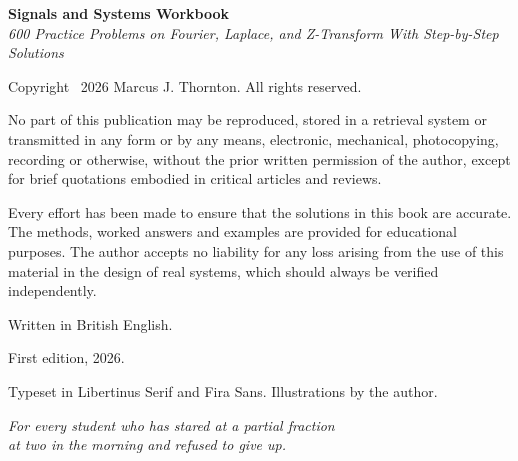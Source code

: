 \clearpage
\thispagestyle{empty}
\vspace*{\fill}
{\footnotesize\setlength{\parindent}{0pt}\setlength{\parskip}{6pt}
\textbf{Signals and Systems Workbook}\\
\textit{600 Practice Problems on Fourier, Laplace, and Z-Transform With Step-by-Step Solutions}

Copyright \textcopyright\ 2026 Marcus J. Thornton. All rights reserved.

No part of this publication may be reproduced, stored in a retrieval system or transmitted in any form or by any
means, electronic, mechanical, photocopying, recording or otherwise, without the prior written permission of the
author, except for brief quotations embodied in critical articles and reviews.

Every effort has been made to ensure that the solutions in this book are accurate. The methods, worked answers and
examples are provided for educational purposes. The author accepts no liability for any loss arising from the use
of this material in the design of real systems, which should always be verified independently.

Written in British English.

First edition, 2026.

Typeset in Libertinus Serif and Fira Sans. Illustrations by the author.
\par}
\clearpage
\thispagestyle{empty}
\vspace*{2in}
\begin{center}\itshape\color{navy}
For every student who has stared at a partial fraction\\ at two in the morning and refused to give up.
\end{center}
\clearpage
{\hypersetup{linkcolor=ink}
\renewcommand{\contentsname}{Contents}
\tableofcontents}
